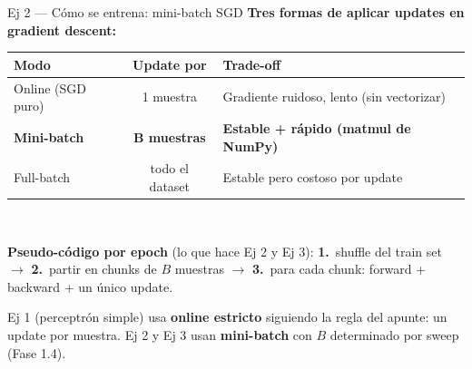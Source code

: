 \documentclass[11pt,aspectratio=169]{beamer}
\begin{document}
\begin{frame}{Ej 2 — Cómo se entrena: mini-batch SGD}
\textbf{Tres formas de aplicar updates en gradient descent:}\\[0.4em]

\centering\small
\begin{tabular}{@{}lcl@{}}
\toprule
\textbf{Modo} & \textbf{Update por} & \textbf{Trade-off} \\
\midrule
Online (SGD puro)    & 1 muestra      & Gradiente ruidoso, lento (sin vectorizar) \\
\rowcolor{accent2!15}
\textbf{Mini-batch}  & \textbf{B muestras} & \textbf{Estable + rápido (matmul de NumPy)} \\
Full-batch           & todo el dataset & Estable pero costoso por update \\
\bottomrule
\end{tabular}\\[0.5em]

\raggedright\small
\textbf{Pseudo-código por epoch} (lo que hace Ej 2 y Ej 3):
\textbf{1.}~shuffle del train set $\to$ \textbf{2.}~partir en chunks de $B$ muestras $\to$ \textbf{3.}~para cada chunk: forward + backward + un único update.\\[0.5em]

\normalsize
\begin{insight}
Ej 1 (perceptrón simple) usa \textbf{online estricto} siguiendo la regla del apunte: un update por muestra. Ej 2 y Ej 3 usan \textbf{mini-batch} con $B$ determinado por sweep (Fase 1.4).
\end{insight}
\end{frame}
\end{document}
